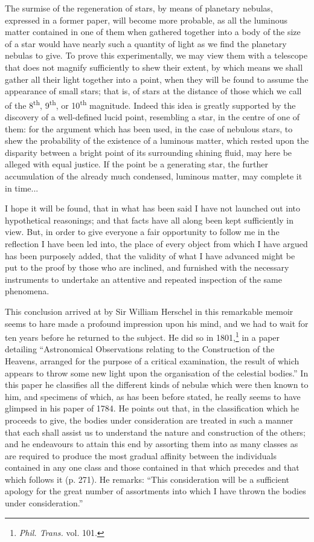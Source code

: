 \documentclass[a4paper, 12pt, oneside, polutonikogreek, english]{article}
\begin{document}
The surmise of the regeneration of stars, by means of planetary nebulas, expressed in a former paper, will become more probable, as all the luminous matter contained in one of them when gathered together into a body of the size of a star would have nearly such a quantity of light as we find the planetary nebulas to give. To prove this experimentally, we may view them with a telescope that does not magnify sufficiently to shew their extent, by which means we shall gather all their light together into a point, when they will be found to assume the appearance of small stars; that is, of stars at the distance of those which we call of the 8\textsuperscript{th}, 9\textsuperscript{th}, or 10\textsuperscript{th} magnitude. Indeed this idea is greatly supported by the discovery of a well-defined lucid point, resembling a star, in the centre of one of them: for the argument which has been used, in the case of nebulous stars, to shew the probability of the existence of a luminous matter, which rested upon the disparity between a bright point of its surrounding shining fluid, may here be alleged with equal justice. If the point be a generating star, the further accumulation of the already much condensed, luminous matter, may complete it in time...

I hope it will be found, that in what has been said I have not launched out into hypothetical reasonings; and that facts have all along been kept sufficiently in view. But, in order to give everyone a fair opportunity to follow me in the reflection I have been led into, the place of every object from which I have argued has been purposely added, that the validity of what I have advanced might be put to the proof by those who are inclined, and furnished with the necessary instruments to undertake an attentive and repeated inspection of the same phenomena.

This conclusion arrived at by Sir William Herschel in this remarkable memoir seems to hare made a profound impression upon his mind, and we had to wait for ten years before he returned to the subject. He did so in 1801,\footnote{\emph{Phil. Trans.} vol. 101.} in a paper detailing ``Astronomical Observations relating to the Construction of the Heavens, arranged for the purpose of a critical examination, the result of which appears to throw some new light upon the organisation of the celestial bodies.'' In this paper he classifies all the different kinds of nebulæ which were then known to him, and specimens of which, as has been before stated, he really seems to have glimpsed in his paper of 1784. He points out that, in the classification which he proceeds to give, the bodies under consideration are treated in such a manner that each shall assist us to understand the nature and construction of the others; and he endeavours to attain this end by assorting them into as many classes as are required to produce the most gradual affinity between the individuals contained in any one class and those contained in that which precedes and that which follows it (p. 271). He remarks: ``This consideration will be a sufficient apology for the great number of assortments into which I have thrown the bodies under consideration.''
\end{document}
